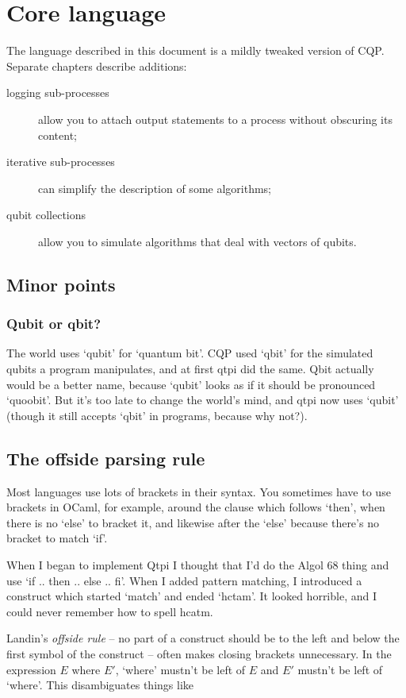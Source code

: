 \documentclass[11pt,a4paper]{book}
\begin{document}
\chapter{Core language}

The language described in this document is a mildly tweaked version of CQP. Separate chapters describe additions:  

\begin{description}
\item[logging sub-processes] allow you to attach output statements to a process without obscuring its content;  
\item[iterative sub-processes] can simplify the description of some algorithms;  
\item[qubit collections] allow you to simulate algorithms that deal with vectors of qubits.
\end{description}

\section{Minor points}
\subsection{Qubit or qbit?}
The world uses `qubit' for `quantum bit'. CQP used `qbit' for the simulated qubits a program manipulates, and at first qtpi did the same. Qbit actually would be a better name, because `qubit' looks as if it should be pronounced `quoobit'. But it's too late to change the world's mind, and qtpi now uses `qubit' (though it still accepts `qbit' in programs, because why not?).

\section{The offside parsing rule}

Most languages use lots of brackets in their syntax. You sometimes have to use brackets in OCaml, for example, around the clause which follows `then', when there is no `else' to bracket it, and likewise after the `else' because there's no bracket to match `if'.

When I began to implement Qtpi I thought that I'd do the Algol 68 thing and use `if .. then .. else .. fi'. When I added pattern matching, I introduced a construct which started `match' and ended `hctam'. It looked horrible, and I could never remember how to spell hcatm.

Landin's \emph{offside rule} -- no part of a construct should be to the left and below the first symbol of the construct -- often makes closing brackets unnecessary. In the expression $E$ where $E'$, `where' mustn't be left of $E$ and $E'$ mustn't be left of `where'. This disambiguates things like 
\end{document}
